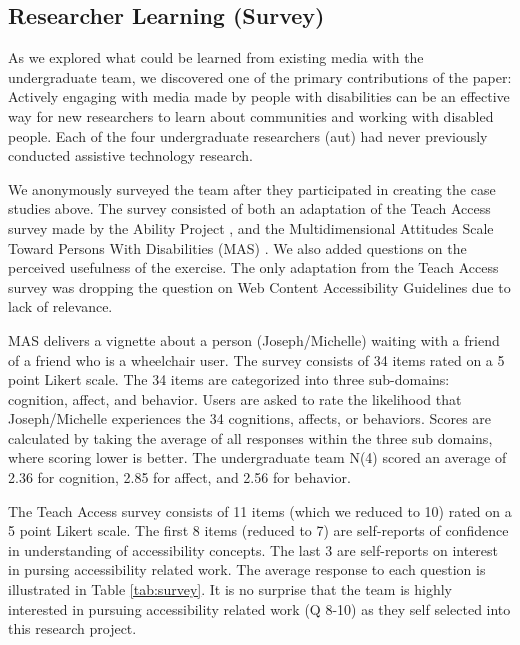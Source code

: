 \subsection{Researcher Learning (Survey)}\label{survey}
As we explored what could be learned from existing media with the undergraduate team, we discovered one of the primary contributions of the paper: Actively engaging with media made by people with disabilities can be an effective way for new researchers to learn about communities and working with disabled people. Each of the four undergraduate researchers (aut) had never previously conducted assistive technology research. 

We anonymously surveyed the team after they participated in creating the case studies above. The survey consisted of both an adaptation of the Teach Access survey made by the Ability Project \cite{kearney-volpeEvaluatingInstructorStrategy2019}, and the Multidimensional Attitudes Scale Toward Persons With Disabilities (MAS) \cite{findlerMultidimensionalAttitudesScale2007}. We also added questions on the perceived usefulness of the exercise. The only adaptation from the Teach Access survey was dropping the question on Web Content Accessibility Guidelines due to lack of relevance. 

MAS delivers a vignette about a person (Joseph/Michelle) waiting with a friend of a friend who is a wheelchair user. The survey consists of 34 items rated on a 5 point Likert scale. The 34 items are categorized into three sub-domains: cognition, affect, and behavior. Users are asked to rate the likelihood that Joseph/Michelle experiences the 34 cognitions, affects, or behaviors. Scores are calculated by taking the average of all responses within the three sub domains, where scoring lower is better. The undergraduate team N(4) scored an average of 2.36 for cognition, 2.85 for affect, and 2.56 for behavior.  

The Teach Access survey consists of 11 items (which we reduced to 10) rated on a 5 point Likert scale. The first 8 items (reduced to 7) are self-reports of confidence in understanding of accessibility concepts. The last 3 are self-reports on interest in pursing accessibility related work. The average response to each question is illustrated in Table \ref{tab:survey}. It is no surprise that the team is highly interested in pursuing accessibility related work (Q 8-10) as they self selected into this research project. 

